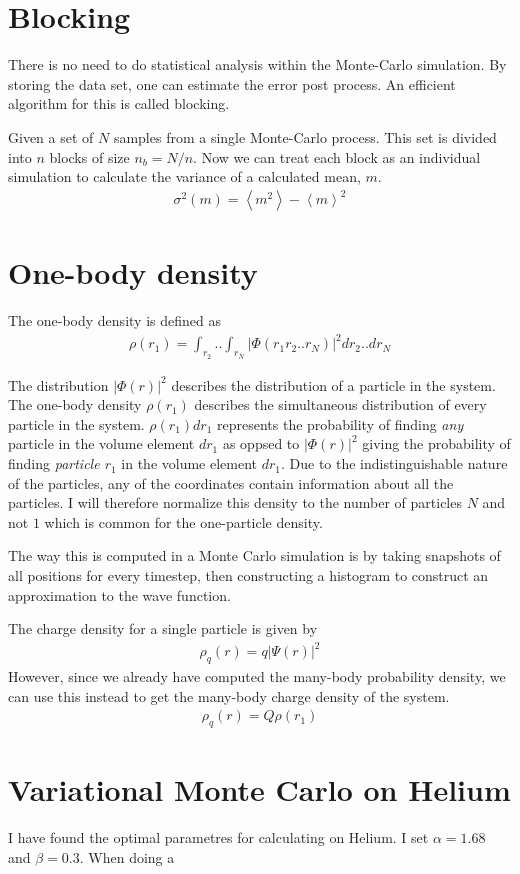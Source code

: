 \documentclass[a4paper, 12pt, titlepage]{article}
\begin{document}
\section*{Blocking}
 There is no need to do statistical analysis within the Monte-Carlo simulation. By storing the data set, one can estimate the error post process. An efficient algorithm for this is called blocking. 

 Given a set of $N$ samples from a single Monte-Carlo process. This set is divided into $n$ blocks of size $n_b = N/n$. Now we can treat each block as an individual simulation to calculate the variance of a calculated mean, $m$. 
 \begin{align*}
 	\sigma^2 (m) = \left<m^2\right> - \left<m\right>^2 
 \end{align*}

\section*{One-body density}
 The one-body density is defined as
 \begin{align*}
 	\rho(r_1) = \int_{r_2} .. \int_{r_N} | \Phi(r_1 r_2 .. r_N) |^2 dr_2 .. dr_N
 \end{align*}

 The distribution $|\Phi(r)|^2$ describes the distribution of a particle in the system. The one-body density $\rho(r_1)$ describes the simultaneous distribution of every particle in the system. $\rho(r_1) dr_1 $ represents the probability of finding \textit{any} particle in the volume element $dr_1$ as oppsed to $|\Phi(r)|^2$ giving the probability of finding \textit{particle $r_1$} in the volume element $dr_1$. Due to the indistinguishable nature of the particles, any of the coordinates contain information about all the particles. I will therefore normalize this density to the number of particles $N$ and not $1$ which is common for the one-particle density. 

 The way this is computed in a Monte Carlo simulation is by taking snapshots of all positions for every timestep, then constructing a histogram to construct an approximation to the wave function.

 The charge density for a single particle is given by 
 \begin{align*}
 	\rho_q (r) = q |\Psi(r)|^2
 \end{align*}
 However, since we already have computed the many-body probability density, we can use this instead to get the many-body charge density of the system. 
 \begin{align*}
 	\rho_q (r) = Q \rho(r_1)
 \end{align*}

\section*{Variational Monte Carlo on Helium}
 I have found the optimal parametres for calculating on Helium. I set $\alpha = 1.68$ and $\beta = 0.3$. When doing a 
\end{document}
